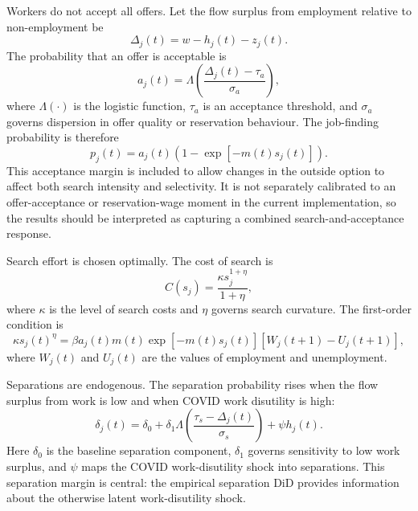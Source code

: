 Workers do not accept all offers. Let the flow surplus from employment relative to non-employment be
\begin{equation}
    \Delta_j(t) = w - h_j(t) - z_j(t).
\end{equation}
The probability that an offer is acceptable is
\begin{equation}
    a_j(t) =
    \Lambda\left(
    \frac{\Delta_j(t)-\tau_a}{\sigma_a}
    \right),
\end{equation}
where $\Lambda(\cdot)$ is the logistic function, $\tau_a$ is an acceptance threshold, and $\sigma_a$ governs dispersion in offer quality or reservation behaviour. The job-finding probability is therefore
\begin{equation}
    p_j(t) = a_j(t)\left(1-\exp[-m(t)s_j(t)]\right).
    \label{eq:model_jfr}
\end{equation}
This acceptance margin is included to allow changes in the outside option to affect both search intensity and selectivity. It is not separately calibrated to an offer-acceptance or reservation-wage moment in the current implementation, so the results should be interpreted as capturing a combined search-and-acceptance response.

Search effort is chosen optimally. The cost of search is
\begin{equation}
    C(s_j) = \frac{\kappa s_j^{1+\eta}}{1+\eta},
\end{equation}
where $\kappa$ is the level of search costs and $\eta$ governs search curvature. The first-order condition is
\begin{equation}
    \kappa s_j(t)^\eta
    =
    \beta a_j(t)m(t)\exp[-m(t)s_j(t)]
    \left[W_j(t+1)-U_j(t+1)\right],
    \label{eq:search_foc_14}
\end{equation}
where $W_j(t)$ and $U_j(t)$ are the values of employment and unemployment.

Separations are endogenous. The separation probability rises when the flow surplus from work is low and when COVID work disutility is high:
\begin{equation}
    \delta_j(t)
    =
    \delta_0
    +
    \delta_1
    \Lambda\left(
    \frac{\tau_s-\Delta_j(t)}{\sigma_s}
    \right)
    +
    \psi h_j(t).
    \label{eq:sep_14}
\end{equation}
Here $\delta_0$ is the baseline separation component, $\delta_1$ governs sensitivity to low work surplus, and $\psi$ maps the COVID work-disutility shock into separations. This separation margin is central: the empirical separation DiD provides information about the otherwise latent work-disutility shock.

